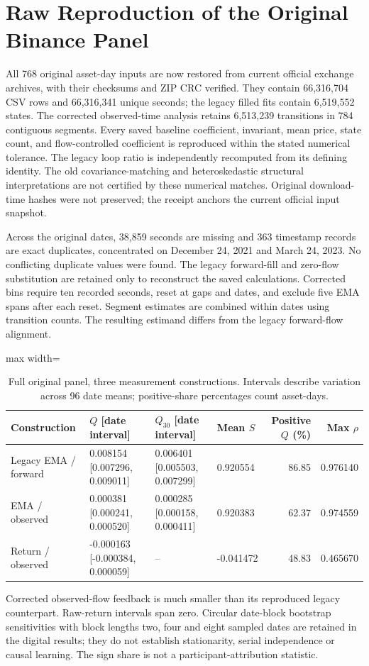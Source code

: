 \section{Raw Reproduction of the Original Binance Panel}
\label{sec:restored_panel}
All 768 original asset-day inputs are now restored from current official exchange archives, with their checksums and ZIP CRC verified. They contain 66,316,704 CSV rows and 66,316,341 unique seconds; the legacy filled fits contain 6,519,552 states. The corrected observed-time analysis retains 6,513,239 transitions in 784 contiguous segments. Every saved baseline coefficient, invariant, mean price, state count, and flow-controlled coefficient is reproduced within the stated numerical tolerance. The legacy loop ratio is independently recomputed from its defining identity. The old covariance-matching and heteroskedastic structural interpretations are not certified by these numerical matches. Original download-time hashes were not preserved; the receipt anchors the current official input snapshot.

Across the original dates, 38,859 seconds are missing and 363 timestamp records are exact duplicates, concentrated on December 24, 2021 and March 24, 2023. No conflicting duplicate values were found. The legacy forward-fill and zero-flow substitution are retained only to reconstruct the saved calculations. Corrected bins require ten recorded seconds, reset at gaps and dates, and exclude five EMA spans after each reset. Segment estimates are combined within dates using transition counts. The resulting estimand differs from the legacy forward-flow alignment.


\begin{table}[htbp]
\centering\small
\caption{Full original panel, three measurement constructions. Intervals describe variation across 96 date means; positive-share percentages count asset-days.}\label{tab:restored_panel_comparison}
\begin{adjustbox}{max width=\textwidth}
\begin{tabular}{llllrr}\toprule
Construction & $Q$ [date interval] & $Q_{30}$ [date interval] & Mean $S$ & Positive $Q$ (\%) & Max $\rho$\\\midrule
Legacy EMA / forward & 0.008154 [0.007296, 0.009011] & 0.006401 [0.005503, 0.007299] & 0.920554 & 86.85 & 0.976140\\
EMA / observed & 0.000381 [0.000241, 0.000520] & 0.000285 [0.000158, 0.000411] & 0.920383 & 62.37 & 0.974559\\
Return / observed & -0.000163 [-0.000384, 0.000059] & -- & -0.041472 & 48.83 & 0.465670\\
\bottomrule\end{tabular}
\end{adjustbox}
\end{table}
Corrected observed-flow feedback is much smaller than its reproduced legacy counterpart. Raw-return intervals span zero. Circular date-block bootstrap sensitivities with block lengths two, four and eight sampled dates are retained in the digital results; they do not establish stationarity, serial independence or causal learning. The sign share is not a participant-attribution statistic.


